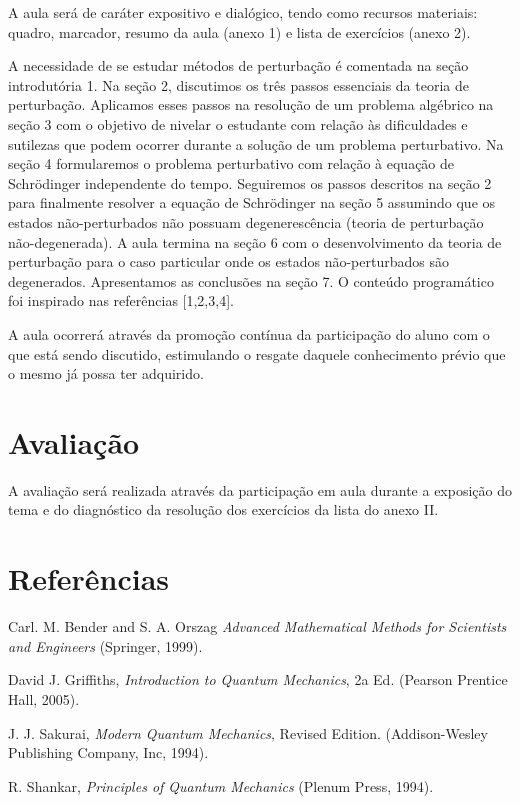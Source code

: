 \documentclass{article}
\begin{document}
A aula será de caráter expositivo e dialógico, tendo como recursos materiais: quadro, marcador, resumo da aula (anexo 1) e lista de exercícios (anexo 2).

A necessidade de se estudar métodos de perturbação é comentada na seção introdutória 1. Na seção 2, discutimos os três passos essenciais da teoria de perturbação. Aplicamos esses passos na resolução de um problema algébrico na seção 3 com o objetivo de nivelar o estudante com relação às dificuldades e sutilezas que podem ocorrer durante a solução de um problema perturbativo. Na seção 4 formularemos o problema perturbativo com relação à equação de Schrödinger independente do tempo. Seguiremos os passos descritos na seção 2 para finalmente resolver a equação de Schrödinger na seção 5 assumindo que os estados não-perturbados não possuam degenerescência (teoria de perturbação não-degenerada). A aula termina na seção 6 com o desenvolvimento da teoria de perturbação para o caso particular onde os estados não-perturbados são degenerados. Apresentamos as conclusões na seção 7.  O conteúdo programático foi inspirado nas referências [1,2,3,4].

A aula ocorrerá através da promoção contínua da participação do aluno com o que está sendo discutido, estimulando o resgate daquele conhecimento prévio que o mesmo já possa ter adquirido.

\section{Avaliação}

A avaliação será realizada através da participação em aula durante a exposição do tema e do diagnóstico da resolução dos exercícios da lista do anexo II. 

\section{Referências}

\noindent [1] Carl. M. Bender and S. A. Orszag \textit{Advanced Mathematical Methods for Scientists and Engineers} (Springer, 1999).

\noindent [2] David J. Griffiths, \textit{Introduction to Quantum Mechanics}, 2a Ed. (Pearson Prentice Hall, 2005).

\noindent [3] J. J. Sakurai, \textit{Modern Quantum Mechanics}, Revised Edition. (Addison-Wesley Publishing Company, Inc, 1994).

\noindent [4] R. Shankar, \textit{Principles of Quantum Mechanics} (Plenum Press, 1994).
\end{document}
